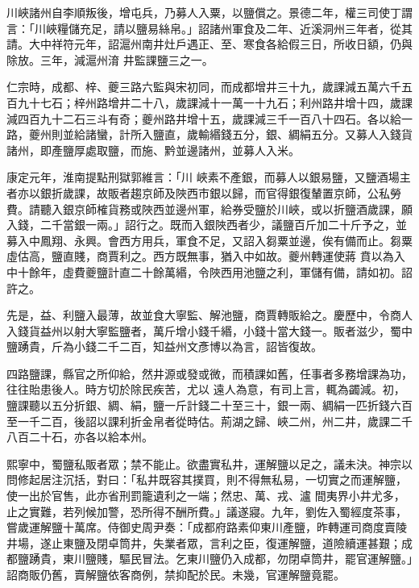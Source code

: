 \begin{pinyinscope}
 川峽諸州自李順叛後，增屯兵，乃募人入粟，以鹽償之。景德二年，權三司使丁謂言：「川峽糧儲充足，請以鹽易絲帛。」詔諸州軍食及二年、近溪洞州三年者，從其請。大中祥符元年，詔滬州南井灶戶遇正、至、寒食各給假三日，所收日額，仍與除放。三年，減滬州淯
 井監課鹽三之一。



 仁宗時，成都、梓、夔三路六監與宋初同，而成都增井三十九，歲課減五萬六千五百九十七石；梓州路增井二十八，歲課減十一萬一十九石；利州路井增十四，歲課減四百九十二石三斗有奇；夔州路井增十五，歲課減三千一百八十四石。各以給一路，夔州則並給諸蠻，計所入鹽直，歲輸緡錢五分，銀、綢絹五分。又募人入錢貨諸州，即產鹽厚處取鹽，而施、黔並邊諸州，並募人入米。



 康定元年，淮南提點刑獄郭維言：「川
 峽素不產銀，而募人以銀易鹽，又鹽酒場主者亦以銀折歲課，故販者趨京師及陜西市銀以歸，而官得銀復輦置京師，公私勞費。請聽入銀京師榷貨務或陜西並邊州軍，給券受鹽於川峽，或以折鹽酒歲課，願入錢，二千當銀一兩。」詔行之。既而入銀陜西者少，議鹽百斤加二十斤予之，並募入中鳳翔、永興。會西方用兵，軍食不足，又詔入芻粟並邊，俟有備而止。芻粟虛估高，鹽直賤，商賈利之。西方既無事，猶入中如故。夔州轉運使蔣
 賁以為入中十餘年，虛費夔鹽計直二十餘萬緡，令陜西用池鹽之利，軍儲有備，請如初。詔許之。



 先是，益、利鹽入最薄，故並食大寧監、解池鹽，商賈轉販給之。慶歷中，令商人入錢貨益州以射大寧監鹽者，萬斤增小錢千緡，小錢十當大錢一。販者滋少，蜀中鹽踴貴，斤為小錢二千二百，知益州文彥博以為言，詔皆復故。



 四路鹽課，縣官之所仰給，然井源或發或微，而積課如舊，任事者多務增課為功，往往貽患後人。時方切於除民疾苦，尤以
 遠人為意，有司上言，輒為蠲減。初，鹽課聽以五分折銀、綢、絹，鹽一斤計錢二十至三十，銀一兩、綢絹一匹折錢六百至一千二百，後詔以課利折金帛者從時估。荊湖之歸、峽二州，州二井，歲課二千八百二十石，亦各以給本州。



 熙寧中，蜀鹽私販者眾；禁不能止。欲盡實私井，運解鹽以足之，議未決。神宗以問修起居注沉括，對曰：「私井既容其撲買，則不得無私易，一切實之而運解鹽，使一出於官售，此亦省刑罰籠遺利之一端；然忠、萬、戎、瀘
 間夷界小井尤多，止之實難，若列候加警，恐所得不酬所費。」議遂寢。九年，劉佐入蜀經度茶事，嘗歲運解鹽十萬席。侍御史周尹奏：「成都府路素仰東川產鹽，昨轉運司商度賣陵井場，遂止東鹽及閉卓筒井，失業者眾，言利之臣，復運解鹽，道險續運甚艱；成都鹽踴貴，東川鹽賤，驅民冒法。乞東川鹽仍入成都，勿閉卓筒井，罷官運解鹽。」詔商販仍舊，賣解鹽依客商例，禁抑配於民。未幾，官運解鹽竟罷。




\end{pinyinscope}
